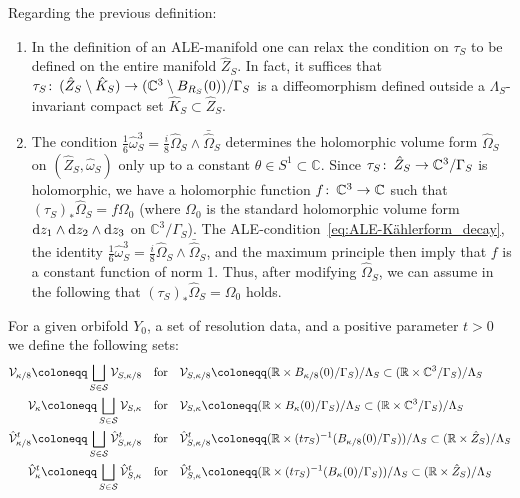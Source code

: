 \documentclass[11pt,a4paper]{scrartcl}
\newcommand*\diff{\mathop{}\!\textup{d}}
\newcommand{\col}{\colon \thinspace}
\numberwithin{equation}{section}
\theoremstyle{plain}
\theoremstyle{definition}
\theoremstyle{remark}
\begin{document}
\begin{remark}
Regarding the previous definition:
\begin{enumerate}
\item \label{bul:ALE-asymptotic-coordinates} In the definition of an ALE-manifold one can relax the condition on $\tau_S$ to be defined on the entire manifold $\hat{Z}_S$. In fact, it suffices that $\tau_S \col (\hat{Z}_S\setminus \hat{K}_S) \to (\mathbb{C}^3 \setminus B_{R_S}(0)) /\Gamma_S$ is a diffeomorphism defined outside a $\Lambda_S$-invariant compact set $\hat{K}_S \subset \hat{Z}_S$. 
\item The condition $\frac{1}{6}\hat{\omega}_S^3 = \frac{i}{8} \hat{\Omega}_S \wedge \bar{\hat{\Omega}}_S$ determines the holomorphic volume form $\hat{\Omega}_S$ on $(\hat{Z}_S,\hat{\omega}_S)$ only up to a constant $\theta \in S^1 \subset \mathbb{C}$. Since $\tau_S \col \hat{Z}_S \to \mathbb{C}^3/\Gamma_S$ is holomorphic, we have a holomorphic function $f \col \mathbb{C}^3 \to \mathbb{C}$ such that $(\tau_S)_* \hat{\Omega}_S = f \Omega_0$ (where $\Omega_0$ is the standard holomorphic volume form $\diff z_1 \wedge \diff z_2 \wedge \diff z_3$ on $\mathbb{C}^3/\Gamma_S$). The ALE-condition~\eqref{eq:ALE-Kählerform_decay}, the identity $\frac{1}{6}\hat{\omega}^3_S = \frac{i}{8}\hat{\Omega}_S \wedge \bar{\hat{\Omega}}_S$, and the maximum principle then imply that $f$ is a constant function of norm 1. Thus, after modifying $\hat{\Omega}_S$, we can assume in the following that $(\tau_S)_*\hat{\Omega}_S = \Omega_0$ holds.
\end{enumerate}
\end{remark}

For a given orbifold $Y_0$, a set of resolution data, and a positive parameter $t>0$ we define the following sets: 
\begin{align*}
\mathcal{V}_{\kappa/8}\coloneqq \bigsqcup_{S\in \mathcal{S}} \mathcal{V}_{S,\kappa/8} \quad &\textup{for} \quad \mathcal{V}_{S,\kappa/8}\coloneqq (\mathbb{R} \times B_{\kappa/8}(0)/\Gamma_S)/\Lambda_S \subset (\mathbb{R} \times \mathbb{C}^3/\Gamma_S)/\Lambda_S \\
\mathcal{V}_{\kappa}\coloneqq \bigsqcup_{S\in \mathcal{S}} \mathcal{V}_{S,\kappa} \quad &\textup{for} \quad \mathcal{V}_{S,\kappa} \coloneqq (\mathbb{R} \times B_{\kappa}(0)/\Gamma_S)/\Lambda_S \subset (\mathbb{R} \times \mathbb{C}^3/\Gamma_S)/\Lambda_S \\
\hat{\mathcal{V}}_{\kappa/8}^t \coloneqq \bigsqcup_{S\in \mathcal{S}} \hat{\mathcal{V}}_{S,\kappa/8}^t \quad &\textup{for} \quad \hat{\mathcal{V}}_{S,\kappa/8}^t \coloneqq (\mathbb{R} \times (t\tau_S)^{-1}(B_{\kappa/8}(0)/\Gamma_S))/\Lambda_S \subset (\mathbb{R} \times \hat{Z}_S)/\Lambda_S \\
\hat{\mathcal{V}}_{\kappa}^t \coloneqq \bigsqcup_{S\in \mathcal{S}} \hat{\mathcal{V}}_{S,\kappa}^t \quad &\textup{for} \quad \hat{\mathcal{V}}_{S,\kappa}^t \coloneqq(\mathbb{R} \times (t \tau_S)^{-1} (B_{\kappa}(0)/\Gamma_S))/\Lambda_S \subset (\mathbb{R} \times \hat{Z}_S)/\Lambda_S
\end{align*}
\end{document}
